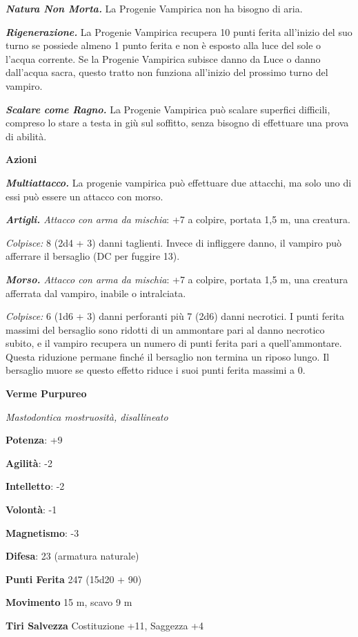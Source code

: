 \begin{multicols}{2}
\emph{\textbf{Natura Non Morta.}} La Progenie Vampirica non ha bisogno
di aria.

\emph{\textbf{Rigenerazione.}} La Progenie Vampirica recupera 10 punti
ferita all'inizio del suo turno se possiede almeno 1 punto ferita e non
è esposto alla luce del sole o l'acqua corrente. Se la Progenie
Vampirica subisce danno da Luce o danno dall'acqua sacra, questo tratto
non funziona all'inizio del prossimo turno del vampiro.

\emph{\textbf{Scalare come Ragno.}} La Progenie Vampirica può scalare
superfici difficili, compreso lo stare a testa in giù sul soffitto,
senza bisogno di effettuare una prova di abilità.

\textbf{Azioni}

\emph{\textbf{Multiattacco.}} La progenie vampirica può effettuare due
attacchi, ma solo uno di essi può essere un attacco con morso.

\emph{\textbf{Artigli.} Attacco con arma da mischia}: +7 a colpire,
portata 1,5 m, una creatura.

\emph{Colpisce:} 8 (2d4 + 3) danni taglienti. Invece di infliggere
danno, il vampiro può afferrare il bersaglio (DC per fuggire 13).

\emph{\textbf{Morso.} Attacco con arma da mischia}: +7 a colpire,
portata 1,5 m, una creatura afferrata dal vampiro, inabile o
intralciata.

\emph{Colpisce:} 6 (1d6 + 3) danni perforanti più 7 (2d6) danni
necrotici. I punti ferita massimi del bersaglio sono ridotti di un
ammontare pari al danno necrotico subito, e il vampiro recupera un
numero di punti ferita pari a quell'ammontare. Questa riduzione permane
finché il bersaglio non termina un riposo lungo. Il bersaglio muore se
questo effetto riduce i suoi punti ferita massimi a 0.

\textbf{Verme Purpureo}

\emph{Mastodontica mostruosità, disallineato}

\textbf{Potenza}: +9

\textbf{Agilità}: -2

\textbf{Intelletto}: -2

\textbf{Volontà}: -1

\textbf{Magnetismo}: -3

\textbf{Difesa}: 23 (armatura naturale)

\textbf{Punti Ferita} 247 (15d20 + 90)

\textbf{Movimento} 15 m, scavo 9 m

\textbf{Tiri Salvezza} Costituzione +11, Saggezza +4


\end{multicols}
